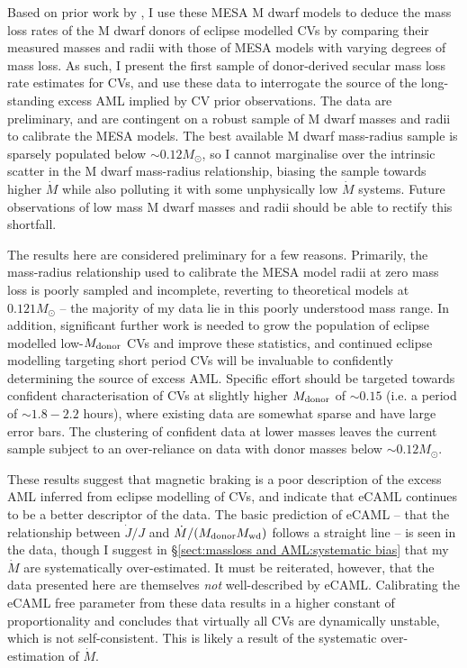 Based on prior work by \citet{knigge2006,knigge11}, I use these MESA M dwarf models to deduce the mass loss rates of the M dwarf donors of eclipse modelled CVs by comparing their measured masses and radii with those of MESA models with varying degrees of mass loss.
As such, I present the first sample of donor-derived secular mass loss rate estimates for CVs, and use these data to interrogate the source of the long-standing excess AML implied by CV prior observations.
The data are preliminary, and are contingent on a robust sample of M dwarf masses and radii to calibrate the MESA models.
The best available M dwarf mass-radius sample is sparsely populated below $\sim 0.12 M_\odot$, so I cannot marginalise over the intrinsic scatter in the M dwarf mass-radius relationship, biasing the sample towards higher $\dot M$ while also polluting it with some unphysically low $\dot M$ systems. Future observations of low mass M dwarf masses and radii should be able to rectify this shortfall.

The results here are considered preliminary for a few reasons. Primarily, the mass-radius relationship used to calibrate the MESA model radii at zero mass loss is poorly sampled and incomplete, reverting to theoretical models at $0.121 M_\odot$ -- the majority of my data lie in this poorly understood mass range.
In addition, significant further work is needed to grow the population of eclipse modelled low-$M_{\rm donor}$ CVs and improve these statistics, and continued eclipse modelling targeting short period CVs will be invaluable to confidently determining the source of excess AML.
Specific effort should be targeted towards confident characterisation of CVs at slightly higher $M_{\rm donor}$ of $\sim0.15$ (i.e. a period of $\sim 1.8 - 2.2$ hours), where existing data are somewhat sparse and have large error bars. The clustering of confident data at lower masses leaves the current sample subject to an over-reliance on data with donor masses below $\sim 0.12 M_\odot$.

These results suggest that magnetic braking is a poor description of the excess AML inferred from eclipse modelling of CVs, and indicate that eCAML continues to be a better descriptor of the data.
The basic prediction of eCAML -- that the relationship between $\dot J / J$ and $\dot M / (M_{\rm donor} M_{\rm wd})$ follows a straight line -- is seen in the data, though I suggest in \S\ref{sect:massloss and AML:systematic bias} that my $\dot M$ are systematically over-estimated.
It must be reiterated, however, that the data presented here are themselves \textit{not} well-described by eCAML.
 Calibrating the eCAML free parameter from these data results in a higher constant of proportionality and concludes that virtually all CVs are dynamically unstable, which is not self-consistent. This is likely a result of the systematic over-estimation of $\dot M$.


